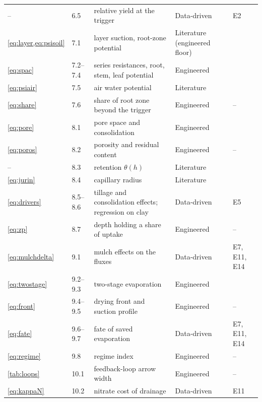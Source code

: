 \documentclass[preprint,12pt]{elsarticle}
\begin{document}
\begin{longtable}{p{1.7cm}p{1.6cm}p{4.9cm}p{2.2cm}p{3.4cm}}
-- & 6.5 & relative yield at the trigger & Data-driven & E2\\
\cref{eq:layer,eq:psisoil} & 7.1 & layer suction, root-zone potential & Literature (engineered floor) & \cite{vanGenuchten1980}\\
\cref{eq:spac} & 7.2--7.4 & series resistances, root, stem, leaf potential & Engineered & \cite{vandenHonert1948}\\
\cref{eq:psiair} & 7.5 & air water potential & Literature & \cite{Nobel2009}\\
\cref{eq:share} & 7.6 & share of root zone beyond the trigger & Engineered & --\\
\cref{eq:pore} & 8.1 & pore space and consolidation & Engineered & \cite{Flanagan1995}\\
\cref{eq:poros} & 8.2 & porosity and residual content & Engineered & --\\
-- & 8.3 & retention $\theta(h)$ & Literature & \cite{vanGenuchten1980}\\
\cref{eq:jurin} & 8.4 & capillary radius & Literature & \cite{Hillel1998}\\
\cref{eq:drivers} & 8.5--8.6 & tillage and consolidation effects; regression on clay & Data-driven & E5\\
\cref{eq:zp} & 8.7 & depth holding a share of uptake & Engineered & --\\
\cref{eq:mulchdelta} & 9.1 & mulch effects on the fluxes & Data-driven & E7, E11, E14\\
\cref{eq:twostage} & 9.2--9.3 & two-stage evaporation & Engineered & \cite{Ritchie1972,Philip1957}\\
\cref{eq:front} & 9.4--9.5 & drying front and suction profile & Engineered & --\\
\cref{eq:fate} & 9.6--9.7 & fate of saved evaporation & Data-driven & E7, E11, E14\\
\cref{eq:regime} & 9.8 & regime index & Engineered & --\\
\cref{tab:loops} & 10.1 & feedback-loop arrow width & Engineered & --\\
\cref{eq:kappaN} & 10.2 & nitrate cost of drainage & Data-driven & E11\\\bottomrule
\end{longtable}
\end{document}
